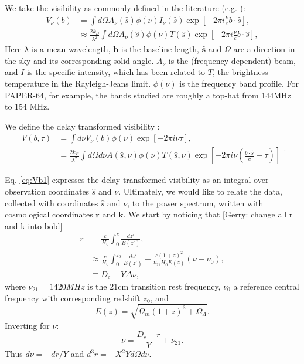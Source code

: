 \documentclass[preprint2,numberedappendix,tighten,twocolappendix]{aastex6}  %
\renewcommand\[{\begin{equation}}
\renewcommand\]{\end{equation}}
\begin{document}
We take the visibility as commonly defined in the literature (e.g.
\cite{first-paper}): 
\begin{equation}
\begin{aligned}V_{\nu}(b) & =\int d\Omega A_{\nu}(\hat{s})\phi(\nu)I_{\nu}(\hat{s})\exp\left[-2\pi i\frac{\nu}{c}b\cdot\hat{s}\right],\\
 & \approx\frac{2k_{B}}{\lambda^{2}}\int d\Omega A_{\nu}(\hat{s})\phi(\nu)T(\hat{s})\exp\left[-2\pi i\frac{\nu}{c}b\cdot\hat{s}\right],
\end{aligned}
\label{eq:Vis1}
\end{equation}
Here $\lambda$ is a mean wavelength, $\boldsymbol{b}$ is the baseline
length, $\hat{\boldsymbol{s}}$ and $\Omega$ are a direction in the
sky and its corresponding solid angle. $A_{\nu}$ is the (frequency
dependent) beam, and $I$ is the specific intensity, which has been
related to $T$, the brightness temperature in the Rayleigh-Jeans
limit. $\phi(\nu)$ is the frequency band profile. For PAPER-64, for example,
the bands studied are roughly a top-hat from 144MHz to 154 MHz. 

We define the delay transformed visibility \cite{delay-transform}:
\small
\begin{equation}
\begin{aligned}V(b,\tau) & =\int d\nu V_{\nu}(b)\phi(\nu)\exp\left[-2\pi i\nu\tau\right],\\
 & =\frac{2k_{B}}{\lambda^{2}}\int d\Omega d\nu A(\hat{s},\nu)\phi(\nu)T(\hat{s},\nu)\exp\left[-2\pi i\nu\left(\frac{b\cdot\hat{s}}{c}+\tau\right)\right]
\end{aligned}
.\label{eq:Vb1}
\end{equation}
\normalsize


Eq. \eqref{eq:Vb1} expresses the delay-transformed visibility as
an integral over observation coordinates $\hat{s}$ and $\nu$. Ultimately,
we would like to relate the data, collected with coordinates $\hat{s}$
and $\nu$, to the power spectrum, written with cosmological coordinates
$\boldsymbol{r}$ and $\boldsymbol{k}$. We start by noticing that
{[}Gerry: change all r and k into bold{]} 
\[
\begin{aligned}r & =\frac{c}{H_{0}}\int_{0}^{z}\frac{dz'}{E(z')},\\
 & \approx\frac{c}{H_{0}}\int_{0}^{z_{0}}\frac{dz'}{E(z')}-\frac{c(1+z)^{2}}{\nu_{21}H_{0}E(z)}\left(\nu-\nu_{0}\right),\\
 & \equiv D_{c}-Y\Delta\nu,
\end{aligned}
\]
where $\nu_{21}=1420MHz$ is the 21cm transition rest frequency, $\nu_{0}$
a reference central frequency with corresponding redshift $z_{0}$,
and 
\[
E(z)=\sqrt{\Omega_{m}(1+z)^{3}+\Omega_{\Lambda}}.
\]
Inverting for $\nu$:
\begin{equation}
\nu=\frac{D_{c}-r}{Y}+\nu_{21}.\label{eq:nur}
\end{equation}
Thus $d\nu=-dr/Y$ and $d^{3}r=-X^{2}Yd\Omega d\nu$. 
\end{document}
